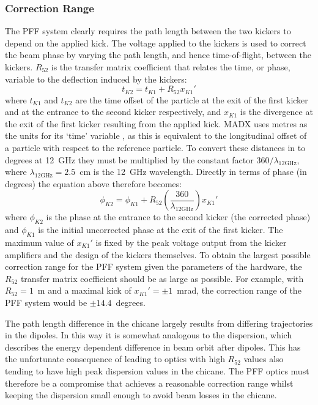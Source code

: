 \subsubsection{Correction Range}

The PFF system clearly requires the path length between the two kickers to depend on the applied kick.  
The voltage applied to the kickers is used to correct the beam phase by varying the path length, and hence time-of-flight, between the kickers. \(R_{52}\) is the transfer matrix coefficient that relates the time, or phase, variable to the deflection induced by the kickers:
\begin{equation}
t_{K2} = t_{K1} + R_{52}x_{K1}'
\end{equation}
where \(t_{K1}\) and \(t_{K2}\) are the time offset of the particle at the exit of the first kicker and at the entrance to the second kicker respectively, and \(x_{K1}\) is the divergence at the exit of the first kicker resulting from the applied kick. MADX uses metres as the units for its `time' variable \cite{madx}, as this is equivalent to the longitudinal offset of a particle with respect to the reference particle. To convert these distances in to degrees at 12~GHz they must be multiplied by the constant factor \(360/\lambda_{\mathrm{12GHz}}\), where \(\lambda_{\mathrm{12GHz}} = 2.5\)~cm is the 12~GHz wavelength. Directly in terms of phase (in degrees) the equation above therefore becomes:
\begin{equation}
\phi_{K2} = \phi_{K1} + R_{52}\left(\frac{360}{\lambda_{\mathrm{12GHz}}}\right)x_{K1}'
\end{equation}
where \(\phi_{K2}\) is the phase at the entrance to the second kicker (the corrected phase) and \(\phi_{K1}\) is the initial uncorrected phase at the exit of the first kicker. The maximum value of \(x_{K1}'\) is fixed by the peak voltage output from the kicker amplifiers and the design of the kickers themselves. To obtain the largest possible correction range for the PFF system given the parameters of the hardware, the \(R_{52}\) transfer matrix coefficient should be as large as possible. For example, with \(R_{52} = 1\)~m and a maximal kick of \(x_{K1}' = \pm 1\)~mrad, the correction range of the PFF system would be \(\pm 14.4\)~degrees.

The path length difference in the chicane largely results from differing trajectories in the dipoles. In this way it is somewhat analogous to the dispersion, which describes the energy dependent difference in beam orbit after dipoles. This has the unfortunate consequence of leading to optics with high \(R_{52}\) values also tending to have high peak dispersion values in the chicane. The PFF optics must therefore be a compromise that achieves a reasonable correction range whilst keeping the dispersion small enough to avoid beam losses in the chicane.

